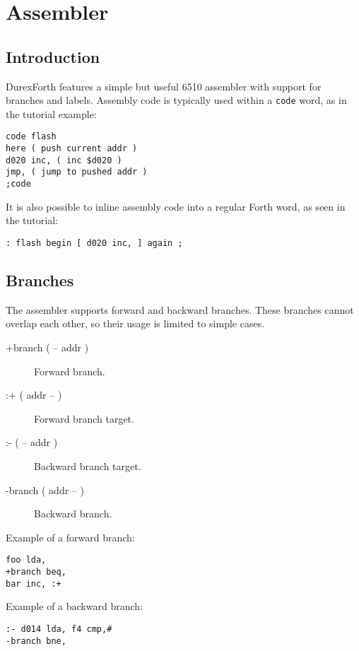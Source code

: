 \chapter{Assembler}

\section{Introduction}

DurexForth features a simple but useful 6510 assembler with support for branches and labels. Assembly code is typically used within a \texttt{code} word, as in the tutorial example:

\begin{verbatim}
code flash
here ( push current addr )
d020 inc, ( inc $d020 )
jmp, ( jump to pushed addr )
;code
\end{verbatim}

It is also possible to inline assembly code into a regular Forth word, as seen in the tutorial:

\begin{verbatim}
: flash begin [ d020 inc, ] again ;
\end{verbatim}

\section{Branches}

The assembler supports forward and backward branches. These branches cannot overlap each other, so their usage is limited to simple cases.

\begin{description}
    \item[+branch ( -- addr )] Forward branch.
    \item[:+ ( addr -- )] Forward branch target.
    \item[:- ( -- addr )] Backward branch target.
    \item[-branch ( addr -- )] Backward branch.
\end{description}

Example of a forward branch:

\begin{verbatim}
foo lda,
+branch beq,
bar inc, :+
\end{verbatim}

Example of a backward branch:

\begin{verbatim}
:- d014 lda, f4 cmp,#
-branch bne,
\end{verbatim}


